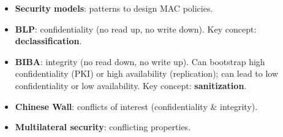 \begin{keybox}[title=Summary]
\begin{itemize}
  \item \textbf{Security models}: patterns to design MAC policies.
  \item \textbf{BLP}: confidentiality (no read up, no write down). Key concept:
        \textbf{declassification}.
  \item \textbf{BIBA}: integrity (no read down, no write up). Can bootstrap high
        confidentiality (PKI) or high availability (replication); can lead to low
        confidentiality or low availability. Key concept: \textbf{sanitization}.
  \item \textbf{Chinese Wall}: conflicts of interest (confidentiality \& integrity).
  \item \textbf{Multilateral security}: conflicting properties.
\end{itemize}
\end{keybox}
